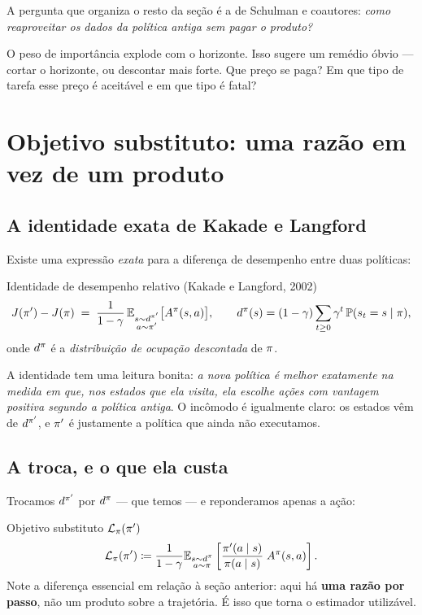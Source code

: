 \documentclass[11pt]{article}
\newcommand{\polnovo}{\pol'}
\newcommand{\Advpi}{A^{\pol}}
\newcommand{\dpi}{d^{\pol}}
\newcommand{\Lsub}[1]{\mathcal{L}_{#1}}
\begin{document}
A pergunta que organiza o resto da seção é a de Schulman e coautores: \emph{como
reaproveitar os dados da política antiga sem pagar o produto?}

\begin{discbox}
  O peso de importância explode com o horizonte. Isso sugere um remédio óbvio --- cortar
  o horizonte, ou descontar mais forte. Que preço se paga? Em que tipo de tarefa esse
  preço é aceitável e em que tipo é fatal?
\end{discbox}

\section{Objetivo substituto: uma razão em vez de um produto}

\subsection{A identidade exata de Kakade e Langford}

Existe uma expressão \emph{exata} para a diferença de desempenho entre duas políticas:

\begin{teobox}{Identidade de desempenho relativo (Kakade e Langford, 2002)}
  \[
    J(\polnovo) - J(\pol) \;=\; \frac{1}{1-\gamma}\,
      \E_{\substack{s\sim d^{\polnovo}\\ a\sim\polnovo}}\bigl[\Advpi(s,a)\bigr],
    \qquad
    \dpi(s) = (1-\gamma)\sum_{t\ge0}\gamma^t\,\Prob(s_t=s\mid\pol),
  \]
  onde $\dpi$ é a \emph{distribuição de ocupação descontada} de $\pi$.
\end{teobox}

A identidade tem uma leitura bonita: \emph{a nova política é melhor exatamente na medida
em que, nos estados que ela visita, ela escolhe ações com vantagem positiva segundo a
política antiga}. O incômodo é igualmente claro: os estados vêm de $d^{\polnovo}$, e
$\polnovo$ é justamente a política que ainda não executamos.

\subsection{A troca, e o que ela custa}

Trocamos $d^{\polnovo}$ por $\dpi$ --- que temos --- e reponderamos apenas a ação:

\begin{defbox}{Objetivo substituto $\Lsub{\pol}(\polnovo)$}
  \[
    \Lsub{\pol}(\polnovo) \defeq \frac{1}{1-\gamma}
      \E_{\substack{s\sim \dpi\\ a\sim\pol}}
      \left[\frac{\polnovo(a\mid s)}{\pol(a\mid s)}\;\Advpi(s,a)\right].
  \]
  Note a diferença essencial em relação à seção anterior: aqui há \textbf{uma razão por
  passo}, não um produto sobre a trajetória. É isso que torna o estimador utilizável.
\end{defbox}
\end{document}
